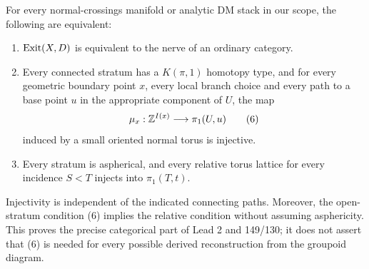 \begin{theorem}\label{P1b1}
For every normal-crossings manifold or analytic DM stack in our scope,
the following are equivalent:
\begin{enumerate}[label=(\roman*)]
\item $\operatorname{Exit}(X,D)$ is equivalent to the nerve of an ordinary category.
\item Every connected stratum has a $K(\pi,1)$ homotopy type, and for
 every geometric boundary point $x$, every local branch choice and every
 path to a base point $u$ in the appropriate component of $U$, the map
 \[
  \mu_x:\mathbb Z^{I(x)}\longrightarrow\pi_1(U,u)                 \tag{6}
 \]
 induced by a small oriented normal torus is injective.
\item Every stratum is aspherical, and every relative torus lattice
 for every incidence $S<T$ injects into $\pi_1(T,t)$.
\end{enumerate}
Injectivity is independent of the indicated connecting paths.  Moreover,
the open-stratum condition (6) implies the relative condition without
assuming asphericity.  This proves the precise categorical part of
Lead 2 and 149/130; it does not assert that (6) is needed for every
possible derived reconstruction from the groupoid diagram.
\end{theorem}
